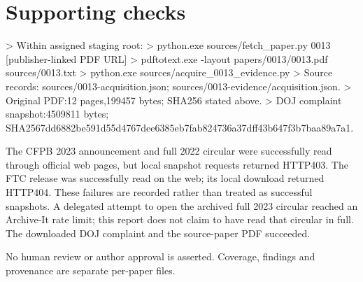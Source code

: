 \documentclass[10pt]{article}
\begin{document}
\section*{Supporting checks}
> Within assigned staging root:
> python.exe sources/fetch\_paper.py 0013 [publisher-linked PDF URL]
> pdftotext.exe -layout papers/0013/0013.pdf sources/0013.txt
> python.exe sources/acquire\_0013\_evidence.py
> Source records: sources/0013-acquisition.json; sources/0013-evidence/acquisition.json.
> Original PDF:12 pages,199457 bytes; SHA256 stated above.
> DOJ complaint snapshot:4509811 bytes; SHA2567dd6882be591d55d4767dee6385eb7fab824736a37dff43b647f3b7baa89a7a1.\par
The CFPB 2023 announcement and full 2022 circular were successfully read through official web pages, but local snapshot requests returned HTTP403. The FTC release was successfully read on the web; its local download returned HTTP404. These failures are recorded rather than treated as successful snapshots. A delegated attempt to open the archived full 2023 circular reached an Archive-It rate limit; this report does not claim to have read that circular in full. The downloaded DOJ complaint and the source-paper PDF succeeded.\par
No human review or author approval is asserted. Coverage, findings and provenance are separate per-paper files.\par
\end{document}

